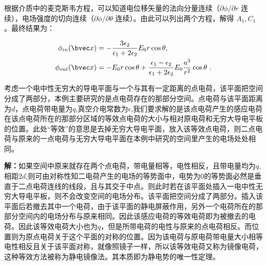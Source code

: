 根据介质中的麦克斯韦方程，可以知道电位移矢量的法向分量连续（$\partial\phi/\partial r$ 连续），电场强度的切向连续（$\partial\phi/\partial \theta$ 连续）。由此可以列出两个方程，解得 $A_1,C_1$。最终结果为：

\begin{align}
\phi_{in}(\bvec x)&=-\frac{3\epsilon_2}{\epsilon_1+2\epsilon_2}E_0r\cos\theta,\\
\phi_{out}(\bvec x)&=-E_0r\cos\theta+\frac{\epsilon_1-\epsilon_2}{\epsilon_1+2\epsilon_2}E_0\frac{a^3}{r^2}\cos\theta~.
\end{align}
\begin{example}{}\label{ex_empoi_1}
考虑一个电中性无穷大的导电平面与一个与其有一定距离的点电荷，该平面把空间分成了两部分，本例主要研究的是点电荷存在的那部分空间。点电荷与该平面距离为$d$，点电荷带电量为$q$,真空介电常数为$\epsilon$,我们要求解的是该点电荷产生的感应电荷在该点电荷所在的那部分区域的等效点电荷的大小与相对原电荷和无穷大导电平板的位置。此处“等效”的意思是去掉无穷大导电平面，放入该等效点电荷，则二点电荷与原来的一点电荷与无穷大导电平面在本例中研究的空间里产生的电场处处相同。
\end{example}
\textbf{解：}如果空间中原来就存在两个点电荷，带电量相等，电性相反，且带电量均为$q$,相距$2d$,则可由对称性知二电荷产生的电场的等势面中，电势为$0$的等势面必然是垂直于二点电荷连线的线段，且与其交于中点。则此时若在该平面处插入一电中性无穷大导电平板，则不会改变空间的电场分布。该平面把空间分成了两部分。插入该平面后若撤去其中一个电荷，由于该平面的静电屏蔽作用，另外一个电荷所在的那部分空间内的电场分布与原来相同。因此该感应电荷的等效电荷即为被撤去的电荷。因此该等效电荷大小也为$q$，但是所带电荷的电性与原来的点电荷相反。而位置则为原点电荷关于这个平面的对称的位置。因为该电荷与原电荷带电量大小相等电性相反且关于该平面对称，就像照镜子一样，所以该等效电荷又称为镜像电荷，这种等效方法被称为静电镜像法。其本质即为静电势的唯一性定理。
